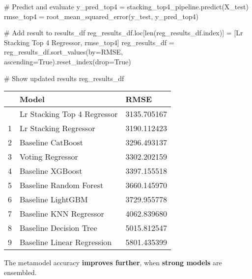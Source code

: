 \documentclass[
  letterpaper,
  DIV=11,
  numbers=noendperiod]{scrreprt}
\newenvironment{Shaded}{\begin{snugshade}}{\end{snugshade}}
\newcommand{\BuiltInTok}[1]{\textcolor[rgb]{0.00,0.23,0.31}{#1}}
\newcommand{\CommentTok}[1]{\textcolor[rgb]{0.37,0.37,0.37}{#1}}
\newcommand{\NormalTok}[1]{\textcolor[rgb]{0.00,0.23,0.31}{#1}}
\newcommand{\OperatorTok}[1]{\textcolor[rgb]{0.37,0.37,0.37}{#1}}
\newcommand{\StringTok}[1]{\textcolor[rgb]{0.13,0.47,0.30}{#1}}
\newcommand{\VariableTok}[1]{\textcolor[rgb]{0.07,0.07,0.07}{#1}}
\begin{document}
\begin{Shaded}
\begin{Highlighting}[]
\CommentTok{\# Predict and evaluate}
\NormalTok{y\_pred\_top4 }\OperatorTok{=}\NormalTok{ stacking\_top4\_pipeline.predict(X\_test)}
\NormalTok{rmse\_top4 }\OperatorTok{=}\NormalTok{ root\_mean\_squared\_error(y\_test, y\_pred\_top4)}

\CommentTok{\# Add result to results\_df}
\NormalTok{reg\_results\_df.loc[}\BuiltInTok{len}\NormalTok{(reg\_results\_df.index)] }\OperatorTok{=}\NormalTok{ [}\StringTok{\textquotesingle{}Lr Stacking Top 4 Regressor\textquotesingle{}}\NormalTok{, rmse\_top4]}
\NormalTok{reg\_results\_df }\OperatorTok{=}\NormalTok{ reg\_results\_df.sort\_values(by}\OperatorTok{=}\StringTok{\textquotesingle{}RMSE\textquotesingle{}}\NormalTok{, ascending}\OperatorTok{=}\VariableTok{True}\NormalTok{).reset\_index(drop}\OperatorTok{=}\VariableTok{True}\NormalTok{)}

\CommentTok{\# Show updated results}
\NormalTok{reg\_results\_df}
\end{Highlighting}
\end{Shaded}

\begin{longtable}[]{@{}lll@{}}
\toprule\noalign{}
& Model & RMSE \\
\midrule\noalign{}
\endhead
\bottomrule\noalign{}
\endlastfoot
0 & Lr Stacking Top 4 Regressor & 3135.705167 \\
1 & Lr Stacking Regressor & 3190.112423 \\
2 & Baseline CatBoost & 3296.493137 \\
3 & Voting Regressor & 3302.202159 \\
4 & Baseline XGBoost & 3397.155518 \\
5 & Baseline Random Forest & 3660.145970 \\
6 & Baseline LightGBM & 3729.955778 \\
7 & Baseline KNN Regressor & 4062.839680 \\
8 & Baseline Decision Tree & 5015.812547 \\
9 & Baseline Linear Regression & 5801.435399 \\
\end{longtable}

The metamodel accuracy \textbf{improves further}, when \textbf{strong
models} are ensembled.
\end{document}
